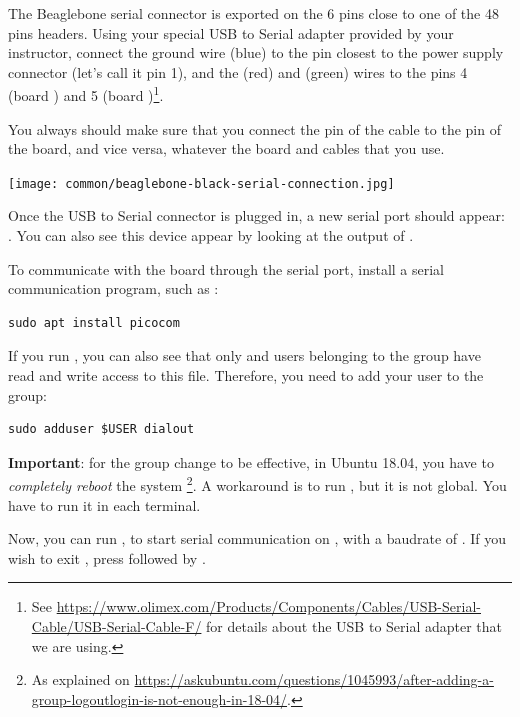 The Beaglebone serial connector is exported on the 6 pins close to one
of the 48 pins headers. Using your special USB to Serial adapter provided
by your instructor, connect the ground wire (blue) to the pin closest
to the power supply connector (let's call it pin 1), and the  (red)
and  (green) wires to the pins 4 (board ) and
5 (board )\footnote{See
\url{https://www.olimex.com/Products/Components/Cables/USB-Serial-Cable/USB-Serial-Cable-F/}
for details about the USB to Serial adapter that we are using.}.

You always should make sure that you connect the  pin of the cable
to the  pin of the board, and vice versa, whatever the board and
cables that you use.

\begin{center}
\texttt{[image: common/beaglebone-black-serial-connection.jpg]}
\end{center}

Once the USB to Serial connector is plugged in, a new serial port
should appear: .  You can also see this device
appear by looking at the output of .

To communicate with the board through the serial port, install a
serial communication program, such as :

\begin{verbatim}
sudo apt install picocom
\end{verbatim}

If you run , you can also see that only
 and users belonging to the  group have
read and write access to this file. Therefore, you need to add your user
to the  group:

\begin{verbatim}
sudo adduser $USER dialout
\end{verbatim}

{\bf Important}: for the group change to be effective, in Ubuntu 18.04, you have to
{\em completely reboot} the system \footnote{As explained on
\url{https://askubuntu.com/questions/1045993/after-adding-a-group-logoutlogin-is-not-enough-in-18-04/}.}.
A workaround is to run , but it is not global.
You have to run it in each terminal.

Now, you can run , to start serial
communication on , with a baudrate of . If
you wish to exit , press \code{[Ctrl][a]} followed by
\code{[Ctrl][x]}.

